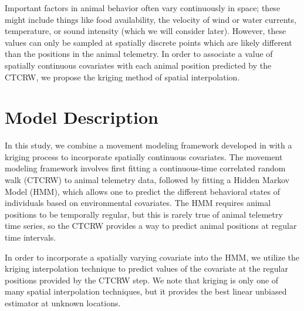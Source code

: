 \documentclass[12pt]{article}
\begin{document}
	Important factors in animal behavior often vary continuously in space; these might include things like food availability, the velocity of wind or water currents, temperature, or sound intensity (which we will consider later). However, these values can only be sampled at spatially discrete points which are likely different than the positions in the animal telemetry. In order to associate a value of spatially continuous covariates with each animal position predicted by the CTCRW, we propose the kriging method of spatial interpolation.
	
	\section{Model Description}
	
	
	
	In this study, we combine a movement modeling framework developed in \cite{Johnson2008, McClintock2012, Michelot2016, Whoriskey2017, McClintock2018} with a kriging process to incorporate spatially continuous covariates. The movement modeling framework involves first fitting a continuous-time correlated random walk (CTCRW) to animal telemetry data, followed by fitting a Hidden Markov Model (HMM), which allows one to predict the different behavioral states of individuals based on environmental covariates. The HMM requires animal positions to be temporally regular, but this is rarely true of animal telemetry time series, so the CTCRW provides a way to predict animal positions at regular time intervals.
	
	 In order to incorporate a spatially varying covariate into the HMM, we utilize the kriging interpolation technique to predict values of the covariate at the regular positions provided by the CTCRW step. We note that kriging is only one of many spatial interpolation techniques, but it provides the best linear unbiased estimator at unknown locations.
	
\end{document}
